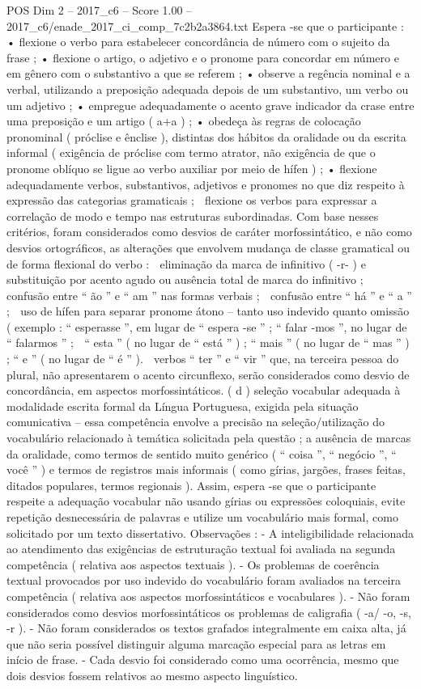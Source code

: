 \begin{textsample}{POS Dim 2 – 2017\_c6 – Score 1.00 – 2017\_c6/enade\_2017\_ci\_comp\_7c2b2a3864.txt}
Espera -se que o participante : • flexione o verbo para estabelecer concordância de número com o sujeito da frase ; • flexione o artigo, o adjetivo e o pronome para concordar em número e em gênero com o substantivo a que se referem ; • observe a regência nominal e a verbal, utilizando a preposição adequada depois de um substantivo, um verbo ou um adjetivo ; • empregue adequadamente o acento grave indicador da crase entre uma preposição e um artigo ( a+a ) ; • obedeça às regras de colocação pronominal ( próclise e ênclise ), distintas dos hábitos da oralidade ou da escrita informal ( exigência de próclise com termo atrator, não exigência de que o pronome oblíquo se ligue ao verbo auxiliar por meio de hífen ) ; • flexione adequadamente verbos, substantivos, adjetivos e pronomes no que diz respeito à expressão das categorias gramaticais ;  flexione os verbos para expressar a correlação de modo e tempo nas estruturas subordinadas.
Com base nesses critérios, foram considerados como desvios de caráter morfossintático, e não como desvios ortográficos, as alterações que envolvem mudança de classe gramatical ou de forma flexional do verbo :  eliminação da marca de infinitivo ( -r- ) e substituição por acento agudo ou ausência total de marca do infinitivo ;  confusão entre “ ão ” e “ am ” nas formas verbais ;  confusão entre “ há ” e “ a ” ;  uso de hífen para separar pronome átono – tanto uso indevido quanto omissão ( exemplo : “ esperasse ”, em lugar de “ espera -se ” ; “ falar -mos ”, no lugar de “ falarmos ” ;  “ esta ” ( no lugar de “ está ” ) ; “ mais ” ( no lugar de “ mas ” ) ; “ e ” ( no lugar de “ é ” ).  verbos “ ter ” e “ vir ” que, na terceira pessoa do plural, não apresentarem o acento circunflexo, serão considerados como desvio de concordância, em aspectos morfossintáticos. ( d ) seleção vocabular adequada à modalidade escrita formal da Língua Portuguesa, exigida pela situação comunicativa – essa competência envolve a precisão na seleção/utilização do vocabulário relacionado à temática solicitada pela questão ; a ausência de marcas da oralidade, como termos de sentido muito genérico ( “ coisa ”, “ negócio ”, “ você ” ) e termos de registros mais informais ( como gírias, jargões, frases feitas, ditados populares, termos regionais ).
Assim, espera -se que o participante respeite a adequação vocabular não usando gírias ou expressões coloquiais, evite repetição desnecessária de palavras e utilize um vocabulário mais formal, como solicitado por um texto dissertativo.
Observações : - A inteligibilidade relacionada ao atendimento das exigências de estruturação textual foi avaliada na segunda competência ( relativa aos aspectos textuais ). - Os problemas de coerência textual provocados por uso indevido do vocabulário foram avaliados na terceira competência ( relativa aos aspectos morfossintáticos e vocabulares ). - Não foram considerados como desvios morfossintáticos os problemas de caligrafia ( -a/ -o, -s, -r ). - Não foram considerados os textos grafados integralmente em caixa alta, já que não seria possível distinguir alguma marcação especial para as letras em início de frase. - Cada desvio foi considerado como uma ocorrência, mesmo que dois desvios fossem relativos ao mesmo aspecto linguístico.

\end{textsample}
